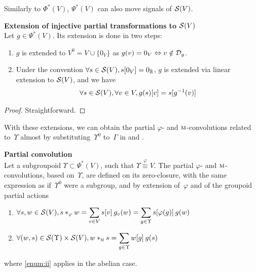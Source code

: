 Similarly to $\Phi^*(V)$, $\Psi^*(V)$ can also move signals of $\cs(V)$.

\begin{lemma}\textbf{Extension of injective partial transformations to $\cs(V)$}\\
Let $g \in \Psi^*(V)$. Its extension is done in two steps:
\begin{enumerate}
  \item $g$ is extended to $V^0 = V \cup \{0_V\}$ as $g(v) = 0_V \Leftrightarrow v \notin \cd_g$.
  \item Under the convention $\forall s \in \cs(V), s[0_V] = 0_\bbr$, $g$ is extended via linear extension to $\cs(V)$, and we have
  \begin{gather*}
  \forall s \in \cs(V), \forall v \in V, g(s)[v] = s[g^{-1}(v)]
  \end{gather*}
\end{enumerate}
\end{lemma}
\begin{proof}
Straightforward.
\end{proof}

With these extensions, we can obtain the partial $\varphi$- and $\M$-convolutions related to~$\Upsilon$ almost by substituting~$\Upsilon^0$ to~$\Gamma$ in  and .

\begin{definition}\textbf{Partial convolution}\\
Let a subgroupoid $\Upsilon \subset \Psi^*(V)$, such that $\Upsilon \overset\varphi\equiv V$. The partial $\varphi$- and $\M$-convolutions, based on~$\Upsilon$, are defined on its zero-closure, with the same expression as if~$\Upsilon^0$ were a subgroup, and by extension of~$\varphi$ and of the groupoid partial actions \ie
\begin{enumerate}[label=(\roman*)]
  \item $\forall s, w \in \cs(V),
  			s \ast_\varphi w = \displaystyle\sum_{v \in V} s[v] \h{2} g_v(w) = \displaystyle\sum_{g \in \Upsilon} s[\varphi(g)] \h{2} g(w)$ \label{enum:i}
  \item $\forall (w,s) \in \cs(\Upsilon) \times \cs(V), w \ast_{\M} s  = \displaystyle\sum_{g \in \Upsilon} w[g] \h{2} g(s)$ \label{enum:ii}
\end{enumerate}
where \ref{enum:ii} applies in the abelian case.
\end{definition}

